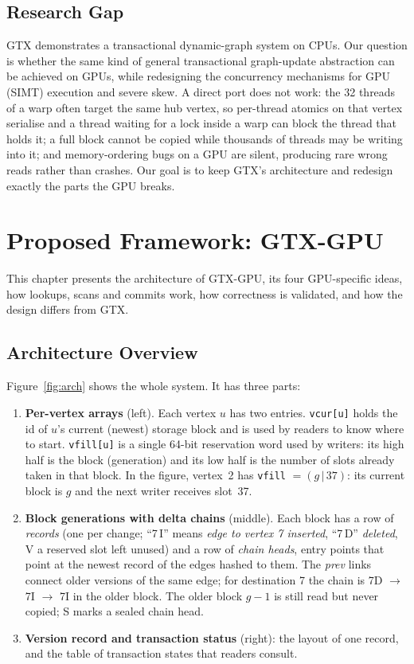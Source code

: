 \documentclass[11pt,a4paper,oneside]{report}
\newcommand{\sys}{GTX-GPU}
\newcommand{\code}[1]{\texttt{#1}}
\begin{document}
\section{Research Gap}
GTX demonstrates a transactional dynamic-graph system on CPUs. Our question is whether the same kind of general
transactional graph-update abstraction can be achieved on GPUs, while redesigning the concurrency mechanisms for GPU
(SIMT) execution and severe skew. A direct port does not work: the 32 threads of a warp often target the same hub
vertex, so per-thread atomics on that vertex serialise and a thread waiting for a lock inside a warp can block the
thread that holds it; a full block cannot be copied while thousands of threads may be writing into it; and
memory-ordering bugs on a GPU are silent, producing rare wrong reads rather than crashes. Our goal is to keep GTX's
architecture and redesign exactly the parts the GPU breaks.

\chapter{Proposed Framework: GTX-GPU}
\label{ch:framework}
This chapter presents the architecture of \sys{}, its four GPU-specific ideas, how lookups, scans and commits work, how
correctness is validated, and how the design differs from GTX.

\section{Architecture Overview}
Figure~\ref{fig:arch} shows the whole system. It has three parts:
\begin{enumerate}
\item \textbf{Per-vertex arrays} (left). Each vertex $u$ has two entries. \code{vcur[u]} holds the id of $u$'s current
  (newest) storage block and is used by readers to know where to start. \code{vfill[u]} is a single 64-bit reservation
  word used by writers: its high half is the block (generation) and its low half is the number of slots already taken
  in that block. In the figure, vertex~2 has \code{vfill} $=(g\,|\,37)$: its current block is $g$ and the next writer
  receives slot~37.
\item \textbf{Block generations with delta chains} (middle). Each block has a row of \emph{records} (one per change;
  ``7\,I'' means \emph{edge to vertex 7 inserted}, ``7\,D'' \emph{deleted}, V a reserved slot left unused) and a row of
  \emph{chain heads}, entry points that point at the newest record of the edges hashed to them. The \emph{prev} links
  connect older versions of the same edge; for destination 7 the chain is 7D $\rightarrow$ 7I $\rightarrow$ 7I in the
  older block. The older block $g{-}1$ is still read but never copied; S marks a sealed chain head.
\item \textbf{Version record and transaction status} (right): the layout of one record, and the table of transaction
  states that readers consult.
\end{enumerate}
\end{document}
